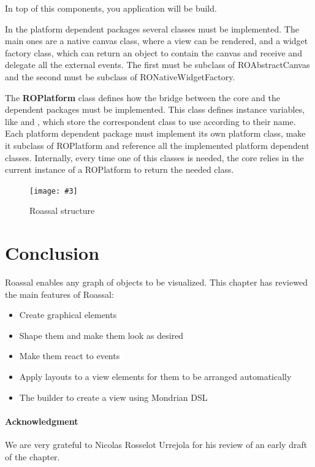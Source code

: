 \documentclass[a4paper,10pt,twoside]{book}
\newcommand{\fig}[4]{
		\begin{figure}[#1]
			\centering
			\texttt{[image: \#3]}
			\caption{\label{fig:#3}#4}
		\end{figure}}
\begin{document}
In top of this components, you application will be build.

In the platform dependent packages several classes must be implemented. The main ones are a native canvas class, where a view can be rendered, and a widget factory class, which can return an object to contain the canvas and receive and delegate all the external events.
The first must be subclass of ROAbstractCanvas and the second must be subclass of RONativeWidgetFactory.

The \textbf{ROPlatform} class defines how the bridge between the core and the dependent packages must be implemented. This class defines instance variables, like  and , which store the correspondent class to use according to their name. 
Each platform dependent package must implement its own platform class, make it subclass of ROPlatform and reference all the implemented platform dependent classes.
Internally, every time one of this classes is needed, the core relies in the current instance of a ROPlatform to return the needed class.

\fig{H}{0.3}{structure}{Roassal structure}



\section{Conclusion}

Roassal enables any graph of objects to be visualized. This chapter has reviewed the main features of Roassal:

\begin{itemize}
\item Create graphical elements
\item Shape them and make them look as desired
\item Make them react to events
\item Apply layouts to a view elements for them to be arranged automatically 
\item The builder to create a view using Mondrian DSL
\end{itemize}

\paragraph{Acknowledgment}
We are very grateful to Nicolas Rosselot Urrejola for his review of an early draft of the chapter.

%
%


\ifx\wholebook\relax\else
   
   
\end{document}
